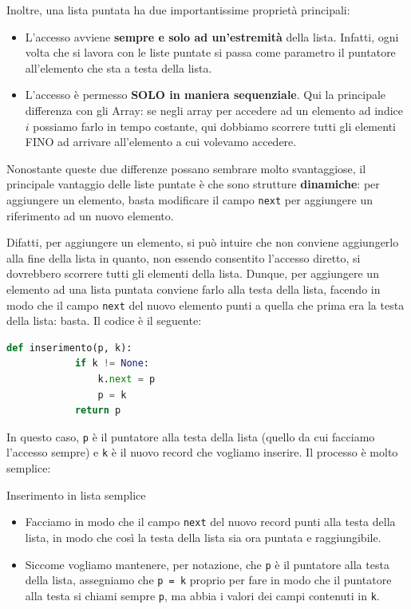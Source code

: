 \documentclass[12pt]{report}
\begin{document}
    Inoltre, una lista puntata ha due importantissime proprietà principali:
    \begin{itemize}
    	\item L'accesso avviene \textbf{sempre e solo ad un'estremità} della lista. Infatti, ogni volta che si lavora con le liste puntate si passa come parametro il puntatore all'elemento che sta a testa della lista.
    	\item L'accesso è permesso \textbf{SOLO in maniera sequenziale}. Qui la principale differenza con gli Array: se negli array per accedere ad un elemento ad indice $i$ possiamo farlo in tempo costante, qui dobbiamo scorrere tutti gli elementi FINO ad arrivare all'elemento a cui volevamo accedere.
    \end{itemize}
    
    Nonostante queste due differenze possano sembrare molto svantaggiose, il principale vantaggio delle liste puntate è che sono strutture \textbf{dinamiche}: per aggiungere un elemento, basta modificare il campo \texttt{next} per aggiungere un riferimento ad un nuovo elemento.
    
    Difatti, per aggiungere un elemento, si può intuire che non conviene aggiungerlo alla fine della lista in quanto, non essendo consentito l'accesso diretto, si dovrebbero scorrere tutti gli elementi della lista. Dunque, per aggiungere un elemento ad una lista puntata conviene farlo alla testa della lista, facendo in modo che il campo \texttt{next} del nuovo elemento punti a quella che prima era la testa della lista: basta. Il codice è il seguente:
    
    \begin{lstlisting}[language=Python, caption={Codice per l'inserimento in testa in una lista concatenata semplice}]
    	def inserimento(p, k):
    		if k != None:
    			k.next = p
    			p = k
    		return p
    \end{lstlisting}
    
    In questo caso, \texttt{p} è il puntatore alla testa della lista (quello da cui facciamo l'accesso sempre) e \texttt{k} è il nuovo record che vogliamo inserire. Il processo è molto semplice:
    
    \begin{algoritmo}{Inserimento in lista semplice}{}
    	\begin{itemize}
    		\item Facciamo in modo che il campo \texttt{next} del nuovo record punti alla testa della lista, in modo che così la testa della lista sia ora puntata e raggiungibile.
    		\item Siccome vogliamo mantenere, per notazione, che \texttt{p} è il puntatore alla testa della lista, assegniamo che \texttt{p = k} proprio per fare in modo che il puntatore alla testa si chiami sempre \texttt{p}, ma abbia i valori dei campi contenuti in \texttt{k}.
    	\end{itemize}
    \end{algoritmo}
    
\end{document}
